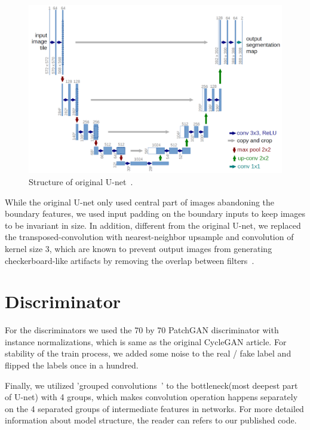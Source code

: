 \begin{figure}[ht]
    \begin{center}
    \includegraphics[scale=0.2]{Graphics/u-net-architecture.png}
    \end{center}
    \caption{Structure of original U-net~\cite{unet}.}\label{FIG:unet}
\end{figure}

While the original U-net only used central part of images abandoning the boundary features, we used input padding on the boundary inputs to keep images to be invariant in size. In addition, different from the original U-net, we replaced the transposed-convolution with nearest-neighbor upsample and convolution of kernel size 3, which are known to prevent output images from generating checkerboard-like artifacts by removing the overlap between filters~\cite{odena2016deconvolution}.

\section{Discriminator}

For the discriminators we used the 70 by 70 PatchGAN discriminator with instance normalizations, which is same as the original CycleGAN article. For stability of the train process, we added some noise to the real / fake label and flipped the labels once in a hundred.

Finally, we utilized 'grouped convolutions~\cite{Grouped}' to the bottleneck(most deepest part of U-net) with 4 groups, which makes convolution operation happens separately on the 4 separated groups of intermediate features in networks. For more detailed information about model structure, the reader can refers to our published code.

\endinput

